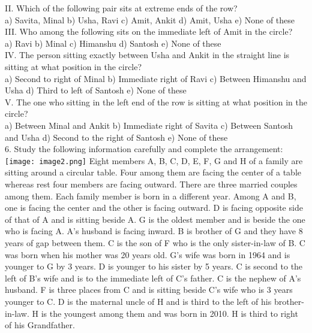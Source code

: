 \documentclass[
]{article}
\begin{document}
II. Which of the following pair sits at extreme ends of the row?\\
a) Savita, Minal \hspace{2mm}b) Usha, Ravi \hspace{2mm}c) Amit, Ankit
\hspace{2mm}d) Amit, Usha \hspace{2mm}e) None of these\\

III. Who among the following sits on the immediate left of Amit in the circle?\\
a) Ravi \hspace{2mm}b) Minal \hspace{2mm}c) Himanshu \hspace{2mm}d) Santosh e) None of these\\

IV. The person sitting exactly between Usha and Ankit in the straight line is sitting at what
position in the circle?\\
a) Second to right of Minal \hspace{2mm}b) Immediate right of Ravi
\hspace{2mm}c) Between Himanshu and Usha \hspace{2mm}d) Third to left of Santosh
\hspace{2mm}e) None of these\\

V. The one who sitting in the left end of the row is sitting at what position in the circle?\\
a) Between Minal and Ankit \hspace{2mm}b) Immediate right of Savita
c) Between Santosh and Usha \hspace{2mm}d) Second to the right of Santosh
e) None of these\\

6. Study the following information carefully and complete the arrangement:\\
\texttt{[image: image2.png]}
Eight members A, B, C, D, E, F, G and H of a family are sitting around a circular table. Four
among them are facing the center of a table whereas rest four members are facing outward.
There are three married couples among them. Each family member is born in a different
year. Among A and B, one is facing the center and the other is facing outward. D is facing
opposite side of that of A and is sitting beside A. G is the oldest member and is beside the
one who is facing A. A’s husband is facing inward. B is brother of G and they have 8 years
of gap between them. C is the son of F who is the only sister-in-law of B. C was born when
his mother was 20 years old. G’s wife was born in 1964 and is younger to G by 3 years. D is
younger to his sister by 5 years. C is second to the left of B’s wife and is to the immediate left
of C’s father. C is the nephew of A’s husband. F is three places from C and is sitting beside
C’s wife who is 3 years younger to C. D is the maternal uncle of H and is third to the left of
his brother-in-law. H is the youngest among them and was born in 2010. H is third to right
of his Grandfather.\\
\end{document}
